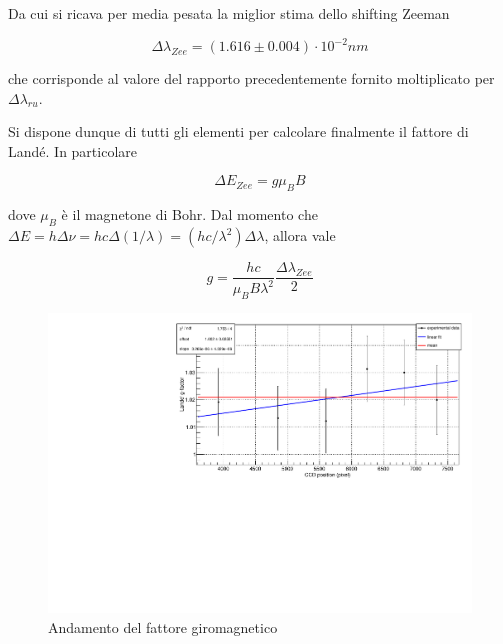 \documentclass{article}
\begin{document}
	Da cui si ricava per media pesata la miglior stima dello shifting Zeeman

	\[
		\Delta\lambda_{Zee} = (1.616 \pm 0.004) \cdot 10^{-2} nm	
	\]

	che corrisponde al valore del rapporto precedentemente fornito moltiplicato per $\Delta\lambda_{ru}$.

	Si dispone dunque di tutti gli elementi per calcolare finalmente il fattore di Landé. In particolare

	\begin{equation}
		\Delta E_{Zee} = g \mu_B B
	\end{equation}

	dove $\mu_B$ è il magnetone di Bohr.
	Dal momento che $\Delta E = h\Delta\nu = hc\Delta(1/\lambda) = (hc / \lambda^2) \Delta\lambda$, 
	allora vale 

	\begin{equation}
		g = \frac{hc}{\mu_B B \lambda^2} \frac{\Delta\lambda_{Zee}}{2}
	\end{equation}

	\begin{center}
		\begin{figure}[H]
			\centering
			\includegraphics[scale=0.38, angle=0]{campomax/g.pdf}
			\setlength{\belowcaptionskip}{-20pt}
			\caption{Andamento del fattore giromagnetico}
			\label{fig:g}
		\end{figure}
	\end{center}
\end{document}
